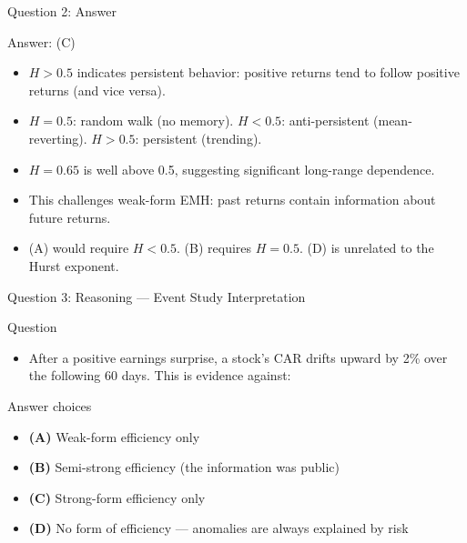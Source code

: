 \documentclass[9pt, aspectratio=169, t]{beamer}
\theoremstyle{definition}
\newenvironment{cminipage}[1]{%
    \par\noindent\hfill\begin{minipage}{#1}\ignorespaces
}{%
    \end{minipage}\hfill\null\par
}
\begin{document}
\begin{frame}{Question 2: Answer}
    \begin{cminipage}{0.95\textwidth}
    \begin{exampleblock}{Answer: (C)}
    \begin{itemize}
        \item $H > 0.5$ indicates persistent behavior: positive returns tend to follow positive returns (and vice versa).
        \item $H = 0.5$: random walk (no memory). $H < 0.5$: anti-persistent (mean-reverting). $H > 0.5$: persistent (trending).
        \item $H = 0.65$ is well above 0.5, suggesting significant long-range dependence.
        \item This challenges weak-form EMH: past returns contain information about future returns.
        \item (A) would require $H < 0.5$. (B) requires $H = 0.5$. (D) is unrelated to the Hurst exponent.
    \end{itemize}
    \end{exampleblock}
    \end{cminipage}
\end{frame}

\begin{frame}{Question 3: Reasoning --- Event Study Interpretation}
    \begin{cminipage}{0.95\textwidth}
    \begin{alertblock}{Question}
        \begin{itemize}
            \item After a positive earnings surprise, a stock's CAR drifts upward by 2\% over the following 60 days. This is evidence against:
        \end{itemize}
    \end{alertblock}

    \vspace{0.3cm}

    \begin{block}{Answer choices}
        \begin{itemize}\setlength{\itemsep}{2pt}
        \item \textcolor{MainBlue}{\textbf{(A)}} Weak-form efficiency only
        \item \textcolor{MainBlue}{\textbf{(B)}} Semi-strong efficiency (the information was public)
        \item \textcolor{MainBlue}{\textbf{(C)}} Strong-form efficiency only
        \item \textcolor{MainBlue}{\textbf{(D)}} No form of efficiency --- anomalies are always explained by risk
        \end{itemize}
    \end{block}
    \end{cminipage}
\end{frame}
\end{document}
